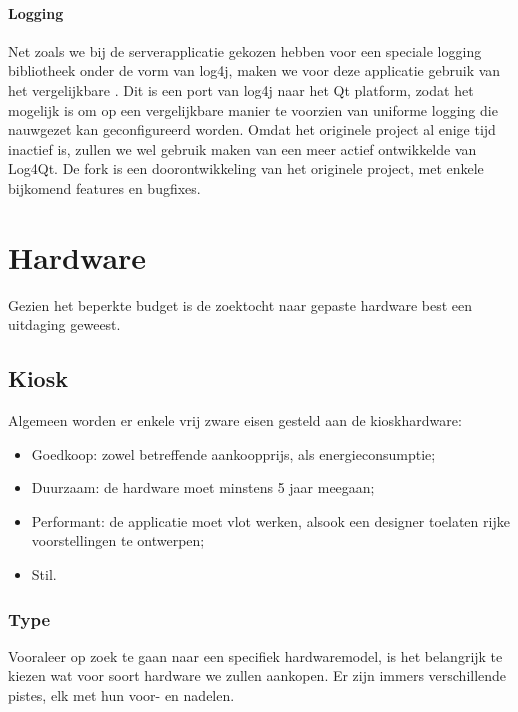 \subsubsection{Logging}

Net zoals we bij de serverapplicatie gekozen hebben voor een speciale logging bibliotheek onder de vorm van log4j, maken we voor deze applicatie gebruik van het vergelijkbare . Dit is een port van log4j naar het Qt platform, zodat het mogelijk is om op een vergelijkbare manier te voorzien van uniforme logging die nauwgezet kan geconfigureerd worden. Omdat het originele project al enige tijd inactief is, zullen we wel gebruik maken van een meer actief ontwikkelde  van Log4Qt. De fork is een doorontwikkeling van het originele project, met enkele bijkomend features en bugfixes.


%
%

\chapter{Hardware}
\label{ontwerp:hardware}

Gezien het beperkte budget is de zoektocht naar gepaste hardware best een uitdaging geweest.

\section{Kiosk}
\label{ontwerp:hardware:kiosk}

Algemeen worden er enkele vrij zware eisen gesteld aan de kioskhardware:
\begin{itemize}
\item Goedkoop: zowel betreffende aankoopprijs, als energieconsumptie;
\item Duurzaam: de hardware moet minstens 5 jaar meegaan;
\item Performant: de applicatie moet vlot werken, alsook een designer toelaten rijke voorstellingen te ontwerpen;
\item Stil.
\end{itemize}

\subsection{Type}

Vooraleer op zoek te gaan naar een specifiek hardwaremodel, is het belangrijk te kiezen wat voor soort hardware we zullen aankopen. Er zijn immers verschillende pistes, elk met hun voor- en nadelen.

